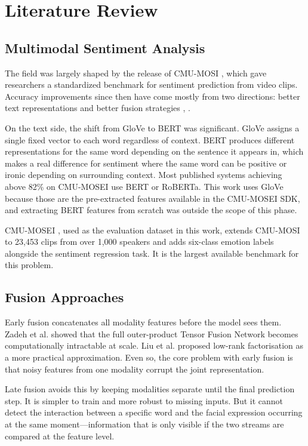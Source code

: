 \documentclass[conference]{IEEEtran}
\begin{document}
\section{Literature Review}

\subsection{Multimodal Sentiment Analysis}
The field was largely shaped by the release of CMU-MOSI \cite{zadeh2016mosi}, which gave researchers a standardized benchmark for sentiment prediction from video clips. Accuracy improvements since then have come mostly from two directions: better text representations and better fusion strategies \cite{baltrusaitis2019multimodal}, \cite{poria2017review}.

On the text side, the shift from GloVe \cite{pennington2014glove} to BERT \cite{devlin2019bert} was significant. GloVe assigns a single fixed vector to each word regardless of context. BERT produces different representations for the same word depending on the sentence it appears in, which makes a real difference for sentiment where the same word can be positive or ironic depending on surrounding context. Most published systems achieving above 82\% on CMU-MOSEI use BERT or RoBERTa. This work uses GloVe because those are the pre-extracted features available in the CMU-MOSEI SDK, and extracting BERT features from scratch was outside the scope of this phase.

CMU-MOSEI \cite{zadeh2018multimodal}, used as the evaluation dataset in this work, extends CMU-MOSI to 23,453 clips from over 1,000 speakers and adds six-class emotion labels alongside the sentiment regression task. It is the largest available benchmark for this problem.

\subsection{Fusion Approaches}
Early fusion concatenates all modality features before the model sees them. Zadeh et al. \cite{zadeh2017tensor} showed that the full outer-product Tensor Fusion Network becomes computationally intractable at scale. Liu et al. \cite{liu2018efficient} proposed low-rank factorisation as a more practical approximation. Even so, the core problem with early fusion is that noisy features from one modality corrupt the joint representation.

Late fusion avoids this by keeping modalities separate until the final prediction step. It is simpler to train and more robust to missing inputs. But it cannot detect the interaction between a specific word and the facial expression occurring at the same moment---information that is only visible if the two streams are compared at the feature level.
\end{document}

